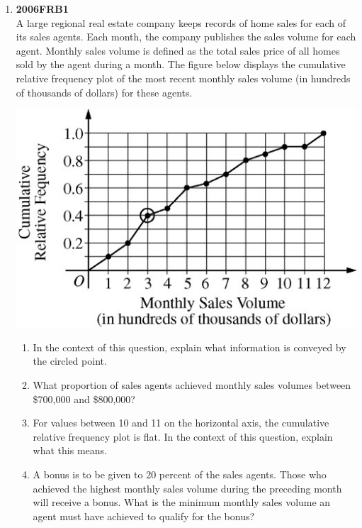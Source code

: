 \documentclass[a4paper,12pt,twoside]{book}
\begin{document}
\begin{itemize}
\begin{enumerate}
    
     \item \textbf{2006FRB1}\\
    A large regional real estate company keeps records of home sales for each of its sales agents. Each month, the company publishes the sales volume for each agent. Monthly sales volume is defined as the total sales price of all homes sold by the agent during a month. The figure below displays the cumulative relative frequency plot of the most recent monthly sales volume (in hundreds of thousands of dollars) for these agents.
       \begin{center}
       \includegraphics[scale=0.5]{2006FRB1.JPG}
       \end{center}
    \begin{enumerate}[label = (\alph*)]
      \item  In the context of this question, explain what information is conveyed by the circled point.
      \item  What proportion of sales agents achieved monthly sales volumes between \$700,000 and \$800,000?
      \item For values between 10 and 11 on the horizontal axis, the cumulative relative frequency plot is flat. In the context of this question, explain what this means.
      \item A bonus is to be given to 20 percent of the sales agents. Those who achieved the highest monthly sales volume during the preceding month will receive a bonus. What is the minimum monthly sales volume an agent must have achieved to qualify for the bonus?
      \end{enumerate}
 \end{enumerate}
\end{itemize}
\end{document}

